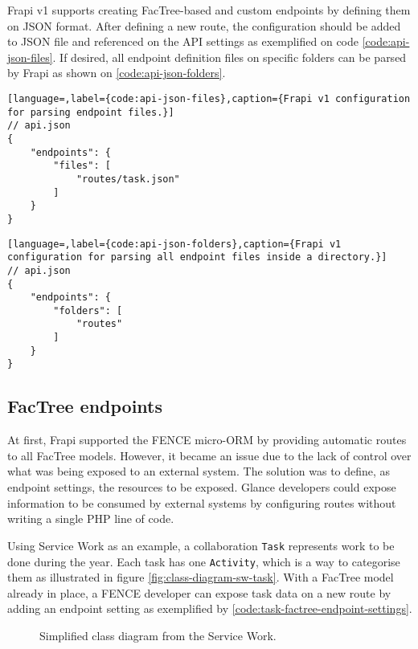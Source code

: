 Frapi v1 supports creating FacTree-based and custom endpoints by defining them on JSON format. After defining a new route, the configuration should be added to JSON file and referenced on the API settings as exemplified on code \autoref{code:api-json-files}. If desired, all endpoint definition files on specific folders can be parsed by Frapi as shown on \autoref{code:api-json-folders}.

\begin{lstlisting}[language=,label={code:api-json-files},caption={Frapi v1 configuration for parsing endpoint files.}]
// api.json
{
	"endpoints": {
	    "files": [
		    "routes/task.json"
	    ]
	}
}
\end{lstlisting}

\begin{lstlisting}[language=,label={code:api-json-folders},caption={Frapi v1 configuration for parsing all endpoint files inside a directory.}]
// api.json
{
	"endpoints": {
		"folders": [
			"routes"
		]
	}
}
\end{lstlisting}


\subsection{FacTree endpoints}

At first, Frapi supported the FENCE micro-ORM by providing automatic routes to all FacTree models. However, it became an issue due to the lack of control over what was being exposed to an external system. The solution was to define, as endpoint settings, the resources to be exposed. Glance developers could expose information to be consumed by external systems by configuring routes without writing a single PHP line of code.

Using Service Work as an example, a collaboration \texttt{Task} represents work to be done during the year. Each task has one \texttt{Activity}, which is a way to categorise them as illustrated in figure \autoref{fig:class-diagram-sw-task}. With a FacTree model already in place, a FENCE developer can expose task data on a new route by adding an endpoint setting as exemplified by \autoref{code:task-factree-endpoint-settings}.

\begin{figure}[htbp]
  \centering
  
  \caption{Simplified class diagram from the Service Work.}
  \label{fig:class-diagram-sw-task}
\end{figure}

